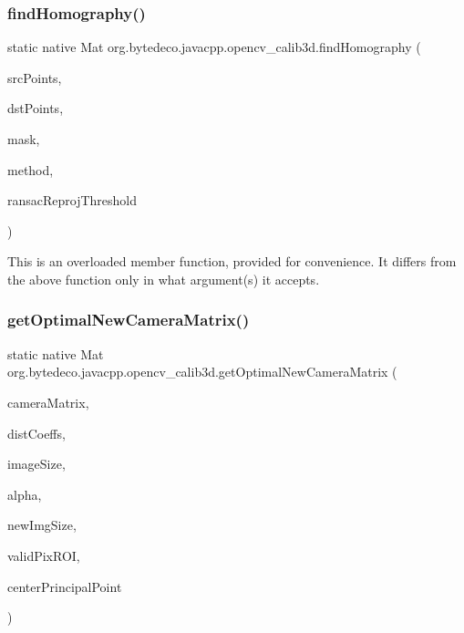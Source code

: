 \subsubsection{\texorpdfstring{find\+Homography()}{findHomography()}\hspace{0.1cm}{\footnotesize\ttfamily [2/2]}}
{\footnotesize\ttfamily static native Mat org.\+bytedeco.\+javacpp.\+opencv\+\_\+calib3d.\+find\+Homography (\begin{DoxyParamCaption}\item[{@By\+Val Mat}]{src\+Points,  }\item[{@By\+Val Mat}]{dst\+Points,  }\item[{@By\+Val Mat}]{mask,  }\item[{int}]{method,  }\item[{double}]{ransac\+Reproj\+Threshold }\end{DoxyParamCaption})\hspace{0.3cm}{\ttfamily [static]}}

This is an overloaded member function, provided for convenience. It differs from the above function only in what argument(s) it accepts. \mbox{\label{group__calib3d_ga70615047cb056a5e3787ce151ddef307}} 
\subsubsection{\texorpdfstring{get\+Optimal\+New\+Camera\+Matrix()}{getOptimalNewCameraMatrix()}}
{\footnotesize\ttfamily static native Mat org.\+bytedeco.\+javacpp.\+opencv\+\_\+calib3d.\+get\+Optimal\+New\+Camera\+Matrix (\begin{DoxyParamCaption}\item[{@By\+Val Mat}]{camera\+Matrix,  }\item[{@By\+Val Mat}]{dist\+Coeffs,  }\item[{@By\+Val Size}]{image\+Size,  }\item[{double}]{alpha,  }\item[{@By\+Val(null\+Value=\char`\"{}cv\+::\+Size()\char`\"{}) Size}]{new\+Img\+Size,  }\item[{Rect}]{valid\+Pix\+R\+OI,  }\item[{@Cast(\char`\"{}bool\char`\"{}) boolean}]{center\+Principal\+Point }\end{DoxyParamCaption})\hspace{0.3cm}{\ttfamily [static]}}



